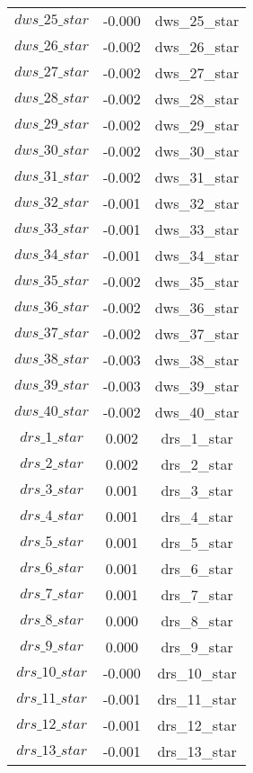\begin{center}
\begin{longtable}{ccc}
$dws\_25\_star$ 	 & 	 -0.000 	 & 	 dws\_25\_star\\
$dws\_26\_star$ 	 & 	 -0.002 	 & 	 dws\_26\_star\\
$dws\_27\_star$ 	 & 	 -0.002 	 & 	 dws\_27\_star\\
$dws\_28\_star$ 	 & 	 -0.002 	 & 	 dws\_28\_star\\
$dws\_29\_star$ 	 & 	 -0.002 	 & 	 dws\_29\_star\\
$dws\_30\_star$ 	 & 	 -0.002 	 & 	 dws\_30\_star\\
$dws\_31\_star$ 	 & 	 -0.002 	 & 	 dws\_31\_star\\
$dws\_32\_star$ 	 & 	 -0.001 	 & 	 dws\_32\_star\\
$dws\_33\_star$ 	 & 	 -0.001 	 & 	 dws\_33\_star\\
$dws\_34\_star$ 	 & 	 -0.001 	 & 	 dws\_34\_star\\
$dws\_35\_star$ 	 & 	 -0.002 	 & 	 dws\_35\_star\\
$dws\_36\_star$ 	 & 	 -0.002 	 & 	 dws\_36\_star\\
$dws\_37\_star$ 	 & 	 -0.002 	 & 	 dws\_37\_star\\
$dws\_38\_star$ 	 & 	 -0.003 	 & 	 dws\_38\_star\\
$dws\_39\_star$ 	 & 	 -0.003 	 & 	 dws\_39\_star\\
$dws\_40\_star$ 	 & 	 -0.002 	 & 	 dws\_40\_star\\
$drs\_1\_star$ 	 & 	 0.002 	 & 	 drs\_1\_star\\
$drs\_2\_star$ 	 & 	 0.002 	 & 	 drs\_2\_star\\
$drs\_3\_star$ 	 & 	 0.001 	 & 	 drs\_3\_star\\
$drs\_4\_star$ 	 & 	 0.001 	 & 	 drs\_4\_star\\
$drs\_5\_star$ 	 & 	 0.001 	 & 	 drs\_5\_star\\
$drs\_6\_star$ 	 & 	 0.001 	 & 	 drs\_6\_star\\
$drs\_7\_star$ 	 & 	 0.001 	 & 	 drs\_7\_star\\
$drs\_8\_star$ 	 & 	 0.000 	 & 	 drs\_8\_star\\
$drs\_9\_star$ 	 & 	 0.000 	 & 	 drs\_9\_star\\
$drs\_10\_star$ 	 & 	 -0.000 	 & 	 drs\_10\_star\\
$drs\_11\_star$ 	 & 	 -0.001 	 & 	 drs\_11\_star\\
$drs\_12\_star$ 	 & 	 -0.001 	 & 	 drs\_12\_star\\
$drs\_13\_star$ 	 & 	 -0.001 	 & 	 drs\_13\_star\\

\end{longtable}
\end{center}
